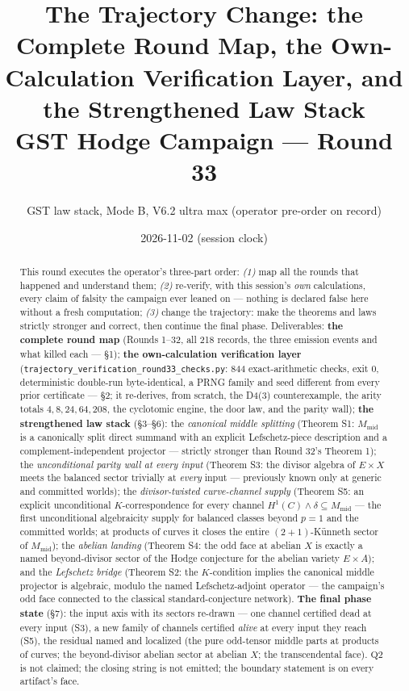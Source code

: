 \documentclass[11pt]{article}
\title{The Trajectory Change: the Complete Round Map, the Own-Calculation Verification Layer, and the Strengthened Law Stack\\[6pt]
\large GST Hodge Campaign --- Round 33}
\author{GST law stack, Mode B, V6.2 ultra max (operator pre-order on record)}
\date{2026-11-02 (session clock)}
\begin{document}
\maketitle

\begin{abstract}
This round executes the operator's three-part order: \emph{(1)} map all the
rounds that happened and understand them; \emph{(2)} re-verify, with this
session's \emph{own} calculations, every claim of falsity the campaign ever
leaned on --- nothing is declared false here without a fresh computation;
\emph{(3)} change the trajectory: make the theorems and laws strictly
stronger and correct, then continue the final phase. Deliverables:
\textbf{the complete round map} (Rounds 1--32, all 218 records, the three
emission events and what killed each --- \S1);
\textbf{the own-calculation verification layer}
(\texttt{trajectory\_verification\_round33\_checks.py}: 844 exact-arithmetic
checks, exit 0, deterministic double-run byte-identical, a PRNG family and
seed different from every prior certificate --- \S2; it re-derives, from
scratch, the D4(3) counterexample, the arity totals $4,8,24,64,208$, the
cyclotomic engine, the door law, and the parity wall);
\textbf{the strengthened law stack} (\S3--\S6): the \emph{canonical middle
splitting} (Theorem S1: $M_{\mathrm{mid}}$ is a canonically split direct
summand with an explicit Lefschetz-piece description and a
complement-independent projector --- strictly stronger than Round 32's
Theorem 1); the \emph{unconditional parity wall at every input} (Theorem S3:
the divisor algebra of $E\times X$ meets the balanced sector trivially at
\emph{every} input --- previously known only at generic and committed worlds);
the \emph{divisor-twisted curve-channel supply} (Theorem S5: an explicit
unconditional $K$-correspondence for every channel
$H^1(C)\wedge\delta\subseteq M_{\mathrm{mid}}$ --- the first unconditional
algebraicity supply for balanced classes beyond $p=1$ and the committed
worlds; at products of curves it closes the entire $(2{+}1)$-Künneth sector of
$M_{\mathrm{mid}}$); the \emph{abelian landing} (Theorem S4: the odd face at
abelian $X$ is exactly a named beyond-divisor sector of the Hodge conjecture
for the abelian variety $E\times A$); and the \emph{Lefschetz bridge}
(Theorem S2: the $K$-condition implies the canonical middle projector is
algebraic, modulo the named Lefschetz-adjoint operator --- the campaign's odd
face connected to the classical standard-conjecture network).
\textbf{The final phase state} (\S7): the input axis with its sectors
re-drawn --- one channel certified dead at every input (S3), a new family of
channels certified \emph{alive} at every input they reach (S5), the residual
named and localized (the pure odd-tensor middle parts at products of curves;
the beyond-divisor abelian sector at abelian $X$; the transcendental face).
$\mathrm{Q2}$ is not claimed; the closing string is not emitted; the boundary
statement is on every artifact's face.
\end{abstract}
\end{document}
